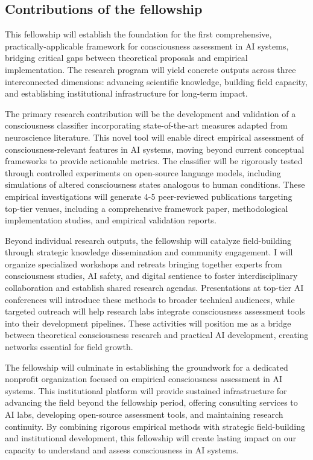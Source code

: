 \documentclass[11pt,a4paper]{article}
\begin{document}
\subsection{Contributions of the fellowship}
This fellowship will establish the foundation for the first comprehensive, practically-applicable framework for consciousness assessment in AI systems, bridging critical gaps between theoretical proposals and empirical implementation. The research program will yield concrete outputs across three interconnected dimensions: advancing scientific knowledge, building field capacity, and establishing institutional infrastructure for long-term impact.

The primary research contribution will be the development and validation of a consciousness classifier incorporating state-of-the-art measures adapted from neuroscience literature. This novel tool will enable direct empirical assessment of consciousness-relevant features in AI systems, moving beyond current conceptual frameworks to provide actionable metrics. The classifier will be rigorously tested through controlled experiments on open-source language models, including simulations of altered consciousness states analogous to human conditions. These empirical investigations will generate 4-5 peer-reviewed publications targeting top-tier venues, including a comprehensive framework paper, methodological implementation studies, and empirical validation reports.

Beyond individual research outputs, the fellowship will catalyze field-building through strategic knowledge dissemination and community engagement. I will organize specialized workshops and retreats bringing together experts from consciousness studies, AI safety, and digital sentience to foster interdisciplinary collaboration and establish shared research agendas. Presentations at top-tier AI conferences will introduce these methods to broader technical audiences, while targeted outreach will help research labs integrate consciousness assessment tools into their development pipelines. These activities will position me as a bridge between theoretical consciousness research and practical AI development, creating networks essential for field growth.

The fellowship will culminate in establishing the groundwork for a dedicated nonprofit organization focused on empirical consciousness assessment in AI systems. This institutional platform will provide sustained infrastructure for advancing the field beyond the fellowship period, offering consulting services to AI labs, developing open-source assessment tools, and maintaining research continuity. By combining rigorous empirical methods with strategic field-building and institutional development, this fellowship will create lasting impact on our capacity to understand and assess consciousness in AI systems.
\end{document}
